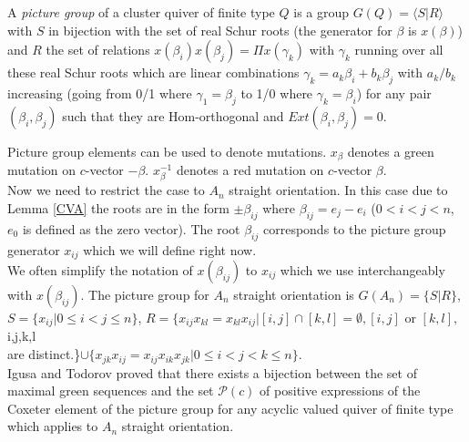 \begin{definition}
\cite{IT17} A \textit{picture group} of a cluster quiver of finite type $Q$ is a group $G(Q)=\langle S|R\rangle$ with $S$ in bijection with the set of real Schur roots (the generator for $\beta$ is $x(\beta)$) and $R$ the set of relations $x(\beta_i)x(\beta_j)=\Pi x(\gamma_k)$ with $\gamma_k$ running over all these real Schur roots which are linear combinations $\gamma_k = a_k\beta_i+b_k\beta_j$ with $a_k/b_k$ increasing (going from 0/1 where $\gamma_1=\beta_j$ to 1/0 where $\gamma_k=\beta_i$) for any pair $(\beta_i,\beta_j)$ such that they are Hom-orthogonal and $Ext(\beta_i,\beta_j)=0$.\\
\end{definition}
\indent Picture group elements can be used to denote mutations. $x_{\beta}$ denotes a green mutation on $c$-vector $-\beta$. $x^{-1}_{\beta}$ denotes a red mutation on $c$-vector $\beta$.\\
\indent Now we need to restrict the case to $A_n$ straight orientation. In this case due to Lemma \ref{CVA} the roots are in the form $\pm\beta_{ij}$ where $\beta_{ij}=e_j-e_i$ ($0<i<j<n$, $e_0$ is defined as the zero vector). The root $\beta_{ij}$ corresponds to the picture group generator $x_{ij}$ which we will define right now.\\
\indent We often simplify the notation of $x(\beta_{ij})$ to $x_{ij}$ which we use interchangeably with $x(\beta_{ij})$. The picture group for $A_n$ straight orientation is $G(A_n)=\{S|R\}$, $S=\{x_{ij}|0\leq i<j\leq n\}$, $R=\{x_{ij}x_{kl}=x_{kl}x_{ij}|[i,j]\cap[k,l]=\emptyset, [i,j]\text{ or }[k,l], $ i,j,k,l \\are distinct.\}$\cup\{x_{jk}x_{ij}=x_{ij}x_{ik}x_{jk}|0\leq i<j<k\leq n\}$.\\
\indent Igusa and Todorov proved \cite{IT17} that there exists a bijection between the set of maximal green sequences and the set $\mathcal{P}(c)$ of positive expressions of the Coxeter element of the picture group for any acyclic valued quiver of finite type which applies to $A_n$ straight orientation.\\
